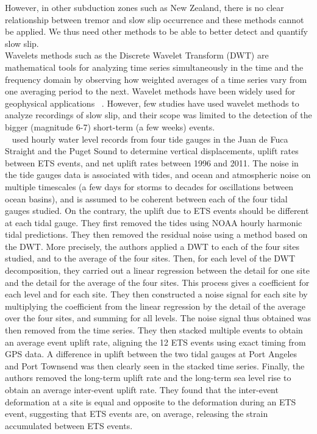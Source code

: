 \documentclass[draft]{agujournal2018}
\begin{document}
However, in other subduction zones such as New Zealand, there is no clear relationship between tremor and slow slip occurrence and these methods cannot be applied. We thus need other methods to be able to better detect and quantify slow slip. \\

Wavelets methods such as the Discrete Wavelet Transform (DWT) are mathematical tools for analyzing time series simultaneously in the time and the frequency domain by observing how weighted averages of a time series vary from one averaging period to the next. Wavelet methods have been widely used for geophysical applications ~\citep{KUM_1997}. However, few studies have used wavelet methods to analyze recordings of slow slip, and their scope was limited to the detection of the bigger (magnitude 6-7) short-term (a few weeks) events. \\

~\citet{ALB_2019} used hourly water level records from four tide gauges in the Juan de Fuca Straight and the Puget Sound to determine vertical displacements, uplift rates between ETS events, and net uplift rates between 1996 and 2011. The noise in the tide gauges data is associated with tides, and ocean and atmospheric noise on multiple timescales (a few days for storms to decades for oscillations between ocean basins), and is assumed to be coherent between each of the four tidal gauges studied. On the contrary, the uplift due to ETS events should be different at each tidal gauge. They first removed the tides using NOAA hourly harmonic tidal predictions. They then removed the residual noise using a method based on the DWT. More precisely, the authors applied a DWT to each of the four sites studied, and to the average of the four sites. Then, for each level of the DWT decomposition, they carried out a linear regression between the detail for one site and the detail for the average of the four sites. This process gives a coefficient for each level and for each site. They then constructed a noise signal for each site by multiplying the coefficient from the linear regression by the detail of the average over the four sites, and summing for all levels. The noise signal thus obtained was then removed from the time series. They then stacked multiple events to obtain an average event uplift rate, aligning the 12 ETS events using exact timing from GPS data. A difference in uplift between the two tidal gauges at Port Angeles and Port Townsend was then clearly seen in the stacked time series. Finally, the authors removed the long-term uplift rate and the long-term sea level rise to obtain an average inter-event uplift rate. They found that the inter-event deformation at a site is equal and opposite to the deformation during an ETS event, suggesting that ETS events are, on average, releasing the strain accumulated between ETS events. \\
\end{document}
